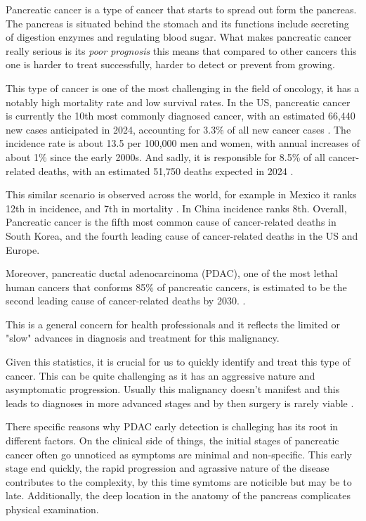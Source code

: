Pancreatic cancer is a type of cancer that starts to spread out form the pancreas. The pancreas is situated behind the stomach and its functions include secreting of digestion enzymes and regulating blood sugar. What makes pancreatic cancer really serious is its \textit{poor prognosis} this means that compared to other cancers this one is harder to treat successfully, harder to detect or prevent from growing.

This type of cancer is one of the most challenging in the field of oncology, it has a notably high mortality rate and low survival rates. In the US, pancreatic cancer is currently the 10th most commonly diagnosed cancer, with an estimated 66,440 new cases anticipated in 2024, accounting for 3.3\% of all new cancer cases \cite{SEER2024}. The incidence rate is about 13.5 per 100,000 men and women, with annual increases of about 1\% since the early 2000s. And sadly, it is responsible for 8.5\% of all cancer-related deaths, with an estimated 51,750 deaths expected in 2024 \cite{SEER2024}.

This similar scenario is observed across the world, for example in Mexico it ranks 12th in incidence, and 7th in mortality \cite{GlobocanMexico}. In China incidence ranks 8th. Overall, Pancreatic cancer is the fifth most common cause of cancer-related deaths in South Korea, and the fourth leading cause of cancer-related deaths in the US and Europe. \cite{NCCNGuidelines}

Moreover, pancreatic ductal adenocarcinoma (PDAC), one of the most lethal human cancers that conforms 85\% of pancreatic cancers, is estimated to be the second leading cause of cancer-related deaths by 2030. \cite{Li2022,Cancers2023}.

This is a general concern for health professionals and it reflects the limited or "slow" advances in diagnosis and treatment for this malignancy.


Given this statistics, it is crucial for us to quickly identify and treat this type of cancer. This can be quite challenging as it has an aggressive nature and asymptomatic progression. Usually this malignancy doesn't manifest and this leads to diagnoses in more advanced stages and by then surgery is rarely viable \cite{Pubmed30721664}.

There specific reasons why PDAC early detection is challeging has its root in different factors. On the clinical side of things, the initial stages of pancreatic cancer often go unnoticed as symptoms are minimal and non-specific. This early stage end quickly, the rapid progression and agrassive nature of the disease contributes to the complexity, by this time symtoms are noticible but may be to late.   Additionally, the deep location in the anatomy of the pancreas complicates physical examination. 

